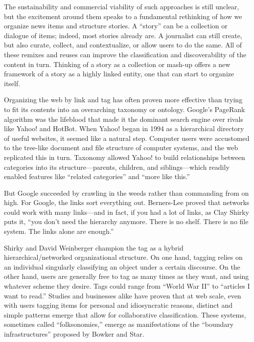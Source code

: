 The sustainability and commercial viability of such approaches is still unclear, but the excitement around them speaks to a fundamental rethinking of how we organize news items and structure stories. A ``story'' can be a collection or dialogue of items; indeed, most stories already are. A journalist can still create, but also curate, collect, and contextualize, or allow users to do the same. All of these remixes and reuses can improve the classification and discoverability of the content in turn. Thinking of a story as a collection or mash-up offers a new framework of a story as a highly linked entity, one that can start to organize itself.

Organizing the web by link and tag has often proven more effective than trying to fit its contents into an overarching taxonomy or ontology. Google's PageRank algorithm was the lifeblood that made it the dominant search engine over rivals like Yahoo! and HotBot.\autocite{shirky_ontology_2005} When Yahoo! began in 1994 as a hierarchical directory of useful websites, it seemed like a natural step. Computer users were accustomed to the tree-like document and file structure of computer systems, and the web replicated this in turn. Taxonomy allowed Yahoo! to build relationships between categories into its structure---parents, children, and siblings---which readily enabled features like ``related categories'' and ``more like this.''

But Google succeeded by crawling in the weeds rather than commanding from on high. For Google, the links sort everything out. Berners-Lee proved that networks could work with many links---and in fact, if you had a lot of links, as Clay Shirky puts it, ``you don't need the hierarchy anymore. There is no shelf. There is no file system. The links alone are enough.''\autocite{shirky_ontology_2005}

Shirky and David Weinberger champion the tag as a hybrid hierarchical/networked organizational structure. On one hand, tagging relies on an individual singularly classifying an object under a certain discourse. On the other hand, users are generally free to tag as many times as they want, and using whatever scheme they desire. Tags could range from ``World War II'' to ``articles I want to read.'' Studies and businesses alike have proven that at web scale, even with users tagging items for personal and idiosyncratic reasons, distinct and simple patterns emerge that allow for collaborative classification.\autocite{cattuto_semiotic_2007} These systems, sometimes called ``folksonomies,'' emerge as manifestations of the ``boundary infrastructures'' proposed by Bowker and Star.\autocite{bowker_sorting_2000}


